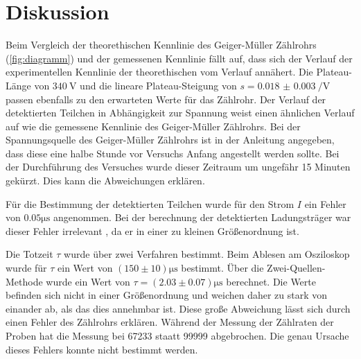 \section{Diskussion}
\label{sec:diskussion}

Beim Vergleich der theorethischen Kennlinie des Geiger-Müller Zählrohrs (\autoref{fig:diagramm}) und der gemessenen Kennlinie
fällt auf, dass sich der Verlauf der experimentellen Kennlinie der theorethischen vom Verlauf annähert.
Die Plateau-Länge von $\SI{340}{\volt}$ und die lineare Plateau-Steigung von $ s= \qty{0.018(3)}{\per\volt}$ passen ebenfalls
zu den erwarteten Werte für das Zählrohr. Der Verlauf der detektierten Teilchen in Abhängigkeit zur Spannung 
weist einen ähnlichen Verlauf auf wie die gemessene Kennlinie des Geiger-Müller Zählrohrs.
Bei der Spannungsquelle des Geiger-Müller Zählrohrs ist in der Anleitung angegeben, dass diese eine halbe Stunde
vor Versuchs Anfang angestellt werden sollte. Bei der Durchführung des Versuches wurde dieser Zeitraum um ungefähr 15 Minuten 
gekürzt. Dies kann die Abweichungen erklären.

Für die Bestimmung der detektierten Teilchen wurde für den Strom $I$ ein Fehler von $0.05 \si{\micro\second}$ angenommen.
Bei der berechnung der detektierten Ladungsträger war dieser Fehler irrelevant , da er in einer zu kleinen Größenordnung ist.

Die Totzeit $\tau$ wurde über zwei Verfahren bestimmt. Beim Ablesen am Osziloskop wurde für $\tau$ ein Wert von
$\left(150 \pm  10\right) \si{\micro\second}$ bestimmt. Über die Zwei-Quellen-Methode wurde ein Wert von $\tau =\left(2.03 \pm 0.07\right) \si{\micro\second}$
berechnet. Die Werte befinden sich nicht in einer Größenordnung und weichen daher zu stark von einander ab, als das dies annehmbar ist.
Diese große Abweichung lässt sich durch einen Fehler des Zählrohrs erklären. Während der Messung der Zählraten der Proben
hat die Messung bei 67233 staatt 99999 abgebrochen. Die genau Ursache dieses Fehlers konnte nicht bestimmt werden.